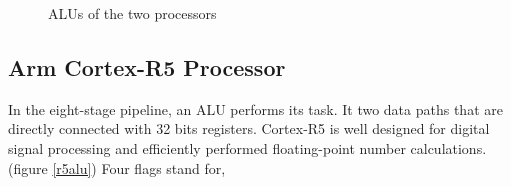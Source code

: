 \documentclass[a4paper,11pt]{article}
\begin{document}
 \begin{figure}[!h]
	\centering
	\hspace{1.5cm}
	\caption{ALUs of the two processors}
\end{figure}

\subsection{Arm Cortex-R5 Processor}
In the eight-stage pipeline, an ALU performs its task. It two data paths that are directly connected with 32 bits registers. Cortex-R5 is well designed for digital signal processing and efficiently performed floating-point number calculations.(figure \ref{r5alu}) Four flags stand for,
\end{document}
